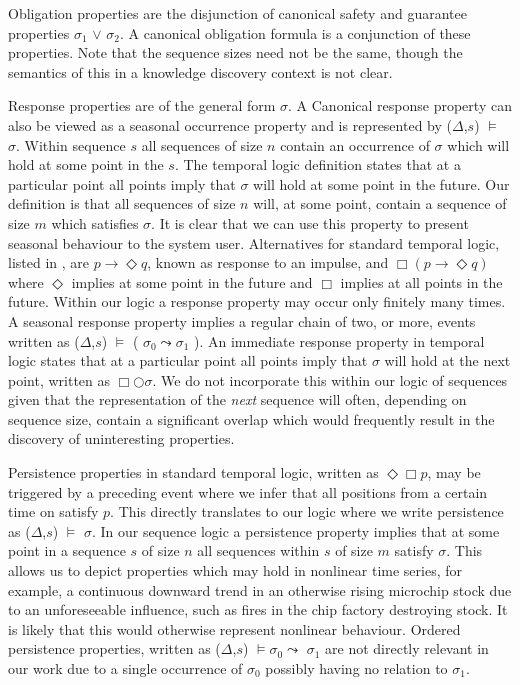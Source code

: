 \medskip

Obligation properties are the disjunction of canonical safety
and guarantee properties  $\sigma_1$ $\vee$ 
$\sigma_2$. A canonical
obligation formula is a conjunction of these properties. Note that the
sequence sizes need not be the same, though the semantics of this in a
knowledge discovery context is not clear.

\smallskip
{}
Response properties are of the general form  $\sigma$. A
Canonical response property can also be viewed as a seasonal 
occurrence property and is represented by 
($\Delta$,$s$) $\models$  $\sigma$. Within sequence $s$ all
sequences of size $n$ contain an occurrence of $\sigma$ which will hold at some point  in the
$s$. The temporal logic definition states that at a particular point
all points imply that $\sigma$ will hold at some point in the
future. Our definition is that  
all sequences of size $n$ will, at some point, contain a sequence of 
size $m$ which satisfies $\sigma$. It is clear that we can use this
property to present seasonal behaviour to the system user.
Alternatives for standard temporal logic, listed in \cite{mp92}, are
$p \to \Diamond q$, 
known as response to an impulse, and
$\Box(p \to \Diamond q)$ where $\Diamond$ implies at some point in the
future and $\Box$ implies at all points in the future.
Within our logic a response property may occur only finitely
many times. A seasonal response property implies a regular chain of
two, or more, events written as
($\Delta$,$s$) $\models$  ( $\sigma_0 \leadsto \sigma_1$
). An immediate response property in temporal logic states that at a
particular point 
all points imply that $\sigma$ will hold at the next point, written as
$\Box \bigcirc \sigma$. We do not incorporate this within our logic of
sequences given that the representation of the {\em next} sequence
will often, depending on sequence size, contain a significant overlap
which would frequently result in the discovery of uninteresting properties.

\medskip
{}

Persistence properties in standard temporal logic, written as
$\Diamond\Box p$, may be triggered by a preceding
event where we infer that all positions from a certain time on
satisfy $p$. This directly translates to our logic where we
write persistence as
($\Delta$,$s$) $\models$ 
 $\sigma$. In our sequence logic a
persistence property implies that at some point in a sequence $s$ of size
$n$ all sequences within $s$ of size $m$ satisfy $\sigma$. This allows
us to depict properties which may hold in nonlinear time
series, for example, a continuous downward trend in an otherwise
rising microchip stock
due to an unforeseeable influence, such as fires in the chip factory
destroying stock. It is likely that this would otherwise represent
nonlinear behaviour. Ordered persistence properties, written as 
($\Delta$,$s$) $\models \sigma_0 \leadsto$  $\sigma_1$ are
not directly relevant in our work due to a single occurrence of
$\sigma_0$ possibly having no relation to  $\sigma_1$.

